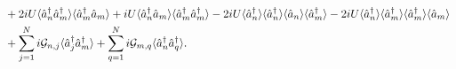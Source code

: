\begin{align}
&+ 2 i U \langle\hat{a}_n^\dagger \hat{a}_m^\dagger \rangle \langle \hat{a}_m^\dagger \hat{a}_m\rangle + i U \langle \hat{a}_n^\dagger \hat{a}_m\rangle \langle \hat{a}_m^\dagger \hat{a}_m^\dagger \rangle - 2 i U \langle\hat{a}_n^\dagger \rangle \langle \hat{a}_n^\dagger \rangle \langle \hat{a}_n \rangle \langle \hat{a}_m^\dagger\rangle - 2 i U \langle \hat{a}_n^\dagger \rangle \langle \hat{a}_m^\dagger \rangle \langle \hat{a}_m^\dagger \rangle \langle \hat{a}_m\rangle \notag \\
& + \sum_{j=1}^N i \mathcal{G}_{n, j} \langle\hat{a}_j^\dagger \hat{a}_m^\dagger\rangle + \sum_{q=1}^N i \mathcal{G}_{m, q} \langle\hat{a}_n^\dagger \hat{a}_q^\dagger\rangle.
\end{align} 
\endgroup

